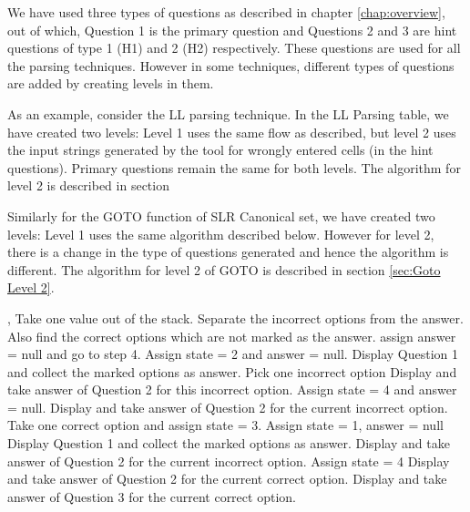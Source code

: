 \begin{algorithm}
\caption{}
\label{algo:}
\begin{algorithmic}[1]
\Function{}{}
\EndFunction
\end{algorithmic}
\end{algorithm}

We have used three types of questions as described in chapter \ref{chap:overview}, out of which, Question 1 is the primary question and Questions 2 and 3 are hint questions of type 1 (H1) and 2 (H2) respectively. These questions are used for all the parsing techniques. However in some techniques, different types of questions are added by creating levels in them.

As an example, consider the LL parsing technique. In the LL Parsing table, we have created two levels: Level 1 uses the same flow as described, but level 2 uses the input strings generated by the tool for wrongly entered cells (in the hint questions). Primary questions remain the same for both levels. The algorithm for level 2 is described in section %

Similarly for the GOTO function of SLR Canonical set, we have created two levels: Level 1 uses the same algorithm described below. However for level 2, there is a change in the type of questions generated and hence the algorithm is different. The algorithm for level 2 of GOTO is described in section \ref{sec:Goto Level 2}.

\begin{algorithm}                     
\begin{algorithmic} [1]
, 
\State Take one value out of the stack.
\State Separate the incorrect options from the answer.
\State Also find the correct options which are not marked as the answer.
\State assign answer = null and go to step 4.
\Else
\State Assign state = 2 and answer = null.
\EndIf
\Else
\State Display Question 1 and collect the marked options as answer.
\EndIf
\EndIf
{}
\State Pick one incorrect option
\State Display and take answer of Question 2 for this incorrect option.
\Else
\State Assign state = 4 and answer = null.
\EndIf
\Else
\State Display and take answer of Question 2 for the current incorrect option.
\EndIf
\EndIf
{}
\State Take one correct option and assign state = 3.
\Else
\State Assign state = 1, answer = null
\State Display Question 1 and collect the marked options as answer.
\EndIf
\Else
\State Display and take answer of Question 2 for the current incorrect option.
\EndIf
\EndIf
{}
\State Assign state = 4
\State Display and take answer of Question 2 for the current correct option.
\Else
\State Display and take answer of Question 3 for the current correct option.
\EndIf
\EndIf
\EndIf
\end{algorithmic}
\end{algorithm}

